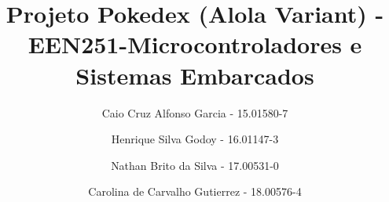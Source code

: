 \documentclass{report}
\title{Projeto Pokedex (Alola Variant) - EEN251-Microcontroladores e Sistemas Embarcados}
\author{
    Caio Cruz Alfonso Garcia - 15.01580-7
    \and
    Henrique Silva Godoy - 16.01147-3
    \and
    Nathan Brito da Silva - 17.00531-0
    \and
    Carolina de Carvalho Gutierrez - 18.00576-4
}
\date{ }
\begin{document}
\maketitle
\tableofcontents{}
\newpage





\end{document}
